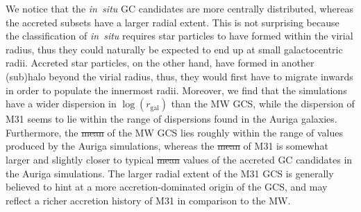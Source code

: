 \documentclass[a4paper,fleqn,usenatbib]{mnras}
\providecommand{\DIFadd}[1]{{\protect\color{blue}\uwave{#1}}} %
\providecommand{\DIFdel}[1]{{\protect\color{red}\sout{#1}}}                      %
\providecommand{\DIFaddbegin}{} %
\providecommand{\DIFaddend}{} %
\providecommand{\DIFdelbegin}{} %
\providecommand{\DIFdelend}{} %
\newcommand{\DIFscaledelfig}{0.5}
\newlength{\DIFdelgraphicswidth} %
\newlength{\DIFdelgraphicsheight} %
\newcommand{\DIFaddincludegraphics}[2][]{{\color{blue}\fbox{\DIFOincludegraphics[#1]{#2}}}} %
\newcommand{\DIFdelincludegraphics}[2][]{%
\sbox{\DIFdelgraphicsbox}{\DIFOincludegraphics[#1]{#2}}%
\settoboxwidth{\DIFdelgraphicswidth}{\DIFdelgraphicsbox} %
\settoboxtotalheight{\DIFdelgraphicsheight}{\DIFdelgraphicsbox} %
\scalebox{\DIFscaledelfig}{%
\parbox[b]{\DIFdelgraphicswidth}{\usebox{\DIFdelgraphicsbox}\\[-\baselineskip] \rule{\DIFdelgraphicswidth}{0em}}\llap{\resizebox{\DIFdelgraphicswidth}{\DIFdelgraphicsheight}{%
\setlength{\unitlength}{\DIFdelgraphicswidth}%
\begin{picture}(1,1)%
\thicklines\linethickness{2pt} %
{\color[rgb]{1,0,0}\put(0,0){\framebox(1,1){}}}%
{\color[rgb]{1,0,0}\put(0,0){\line( 1,1){1}}}%
{\color[rgb]{1,0,0}\put(0,1){\line(1,-1){1}}}%
\end{picture}%
}\hspace*{3pt}}} %
} %
\DeclareRobustCommand{\DIFaddbegin}{\DIFOaddbegin \let\includegraphics\DIFaddincludegraphics} %
\DeclareRobustCommand{\DIFaddend}{\DIFOaddend \let\includegraphics\DIFOincludegraphics} %
\DeclareRobustCommand{\DIFdelbegin}{\DIFOdelbegin \let\includegraphics\DIFdelincludegraphics} %
\DeclareRobustCommand{\DIFdelend}{\DIFOaddend \let\includegraphics\DIFOincludegraphics} %
\begin{document}
We notice that the {\it in~situ} GC candidates are more centrally distributed, 
whereas the accreted subsets have a larger radial extent. This 
is not surprising because the classification of {\it in~situ} requires star particles 
to have formed within the virial radius, thus they could naturally be expected 
to end up at small galactocentric radii. Accreted star particles, on the other 
hand, have formed in another (sub)halo beyond the virial radius, thus, they would 
first have to migrate inwards in order to populate the innermost radii. Moreover,
we find that the simulations have a wider dispersion in $\log(r_{\text{gal}})$ than
the MW GCS, while the dispersion of M31 seems to lie within the range of dispersions
found in the Auriga galaxies. Furthermore, the \DIFdelbegin \DIFdel{mean }\DIFdelend \DIFaddbegin \DIFadd{median }\DIFaddend of the MW GCS lies roughly 
within the range of values produced by the Auriga simulations, whereas the \DIFdelbegin \DIFdel{mean 
}\DIFdelend \DIFaddbegin \DIFadd{median
}\DIFaddend of M31 is somewhat larger and slightly closer to typical \DIFdelbegin \DIFdel{mean }\DIFdelend \DIFaddbegin \DIFadd{median }\DIFaddend values of the 
accreted GC candidates in the Auriga simulations. The larger radial extent 
of the M31 GCS is generally believed to hint at a more accretion-dominated origin 
of the GCS, and may reflect a richer accretion history of M31 in comparison 
to the MW.
\end{document}
